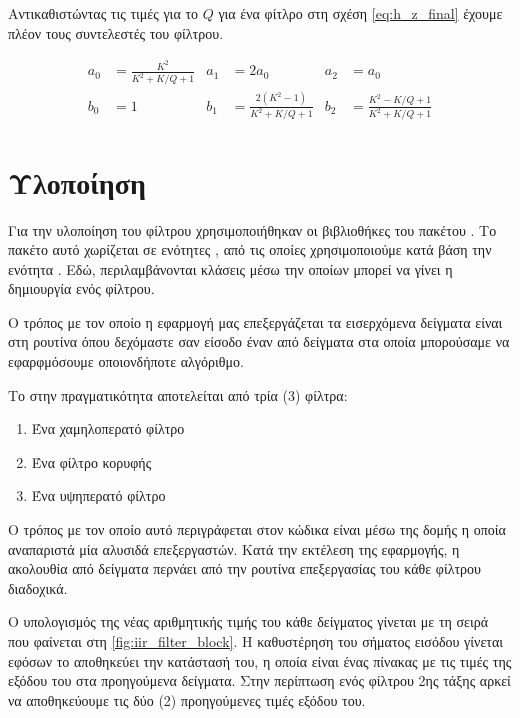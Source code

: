 \documentclass{article}
\begin{document}
Αντικαθιστώντας τις τιμές για το $Q$ για ένα φίτλρο  στη σχέση \ref{eq:h_z_final}
έχουμε πλέον τους συντελεστές του φίλτρου. 


\begin{align}
    a_0 &= \frac{K^2}{K^2 + K/Q +1} & a_1 &= 2a_0 & a_2 &= a_0 \\
    b_0 &= 1 & b_1 &= \frac{2(K^2 - 1)}{K^2 + K/Q + 1} & b_2 &= \frac{K^2 - K/Q + 1}{K^2 + K/Q + 1}
\end{align}

\section{Υλοποίηση}

Για την υλοποίηση του φίλτρου χρησιμοποιήθηκαν οι βιβλιοθήκες του πακέτου 
. Το πακέτο αυτό χωρίζεται σε ενότητες , από τις οποίες
χρησιμοποιούμε κατά βάση την ενότητα . 
Εδώ, περιλαμβάνονται κλάσεις μέσω την οποίων μπορεί να γίνει η δημιουργία 
ενός φίλτρου.

Ο τρόπος με τον οποίο η εφαρμογή μας επεξεργάζεται τα εισερχόμενα δείγματα
 είναι στη ρουτίνα  όπου δεχόμαστε σαν είσοδο έναν
 από δείγματα στα οποία μπορούσαμε να εφαρφμόσουμε οποιονδήποτε αλγόριθμο. 

Το  στην πραγματικότητα αποτελείται από τρία (3) φίλτρα: 

\begin{enumerate}
    \item Ένα χαμηλοπερατό φίλτρο 
    \item Ένα φίλτρο κορυφής
    \item Ένα υψηπερατό φίλτρο
\end{enumerate}

Ο τρόπος με τον οποίο αυτό περιγράφεται στον κώδικα είναι μέσω της δομής 
 η οποία αναπαριστά μία αλυσιδά επεξεργαστών. 
Κατά την εκτέλεση της εφαρμογής, η ακολουθία από δείγματα
περνάει από την ρουτίνα επεξεργασίας του κάθε φίλτρου διαδοχικά. \cite{JuceDocumentation}

Ο υπολογισμός της νέας αριθμητικής τιμής του κάθε δείγματος γίνεται με 
τη σειρά που φαίνεται στη \cref{fig:iir_filter_block}. 
Η καθυστέρηση του σήματος εισόδου γίνεται εφόσων το 
αποθηκεύει την κατάστασή του, η οποία είναι ένας πίνακας με τις τιμές της εξόδου 
του στα προηγούμενα δείγματα. Στην περίπτωση ενός φίλτρου 2ης τάξης 
αρκεί να αποθηκεύουμε τις δύο (2) προηγούμενες τιμές εξόδου του.
\end{document}
